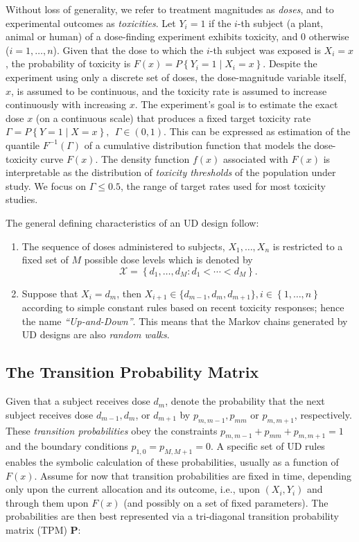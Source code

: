 Without loss of generality, we refer to treatment magnitudes as \emph{doses}, and to experimental outcomes as \emph{toxicities}. Let $Y_i = 1$ if the $i$-th subject (a plant, animal or human) of a dose-finding experiment exhibits toxicity, and $0$ otherwise ($i=1,\ldots ,n$). Given that the dose to which the $i$-th subject was exposed is $X_i=x$, the probability of toxicity is $F(x) = P\left\{Y_i=1\mid X_i =x\right\}$. Despite the experiment using only a discrete set of doses, the dose-magnitude variable itself, $x$, is assumed to be continuous, and the toxicity rate is assumed to increase continuously with increasing $x$.  The experiment's goal is to estimate the exact dose $x$ (on a continuous scale) that produces a fixed target toxicity rate $\Gamma=P\left\{Y=1\mid X=x\right\}, \ \ \Gamma\in(0,1)$. This can be expressed as estimation of the quantile  $F^{-1}(\Gamma)$ of a cumulative distribution function that models the dose-toxicity curve $F(x)$.  The density function $f(x)$ associated with $F(x)$ is interpretable as the distribution of \emph{toxicity thresholds} of the population under study. We focus on $\Gamma\leq 0.5$, the range of target rates used for most toxicity studies.

The general defining characteristics of an UD design follow:
\begin{enumerate}
\item The sequence of doses administered to subjects, $X_1,\ldots,X_n$ is restricted to a fixed set of $M$ possible dose levels which is denoted by $$\mathcal{X} =\left\{d_1,\ldots ,d_M : d_1 <\cdots <d_M\right\}.$$
\item Suppose that $X_i=d_m$, then $X_{i+1}\in\{d_{m-1},d_m,d_{m+1}\},i\in\left\{1,\ldots ,n\right\}$ according to simple constant rules based on recent toxicity responses; hence the name \emph{``Up-and-Down''}. This means that the Markov chains generated by UD designs are also \emph{random walks}.
\end{enumerate}

\subsection{The Transition Probability Matrix}\label{sec:tpm}

 Given that a subject receives dose $d_m$, denote the probability that the next subject receives dose $d_{m-1},d_m$, or $d_{m+1}$ by $p_{m,m-1},p_{mm}$ or $p_{m,m+1}$, respectively. These  \emph{transition probabilities} obey the constraints $p_{m,m-1}+p_{mm}+p_{m,m+1}=1$ and the boundary conditions $p_{1,0}=p_{M,M+1}=0$. A specific set of UD rules enables the symbolic calculation of these probabilities, usually as a function of $F(x)$. Assume for now that transition probabilities are fixed in time, depending only upon the current allocation and its outcome, i.e., upon $\left(X_i,Y_i\right)$ and through them upon $F(x)$ (and possibly on a set of fixed parameters). The probabilities are then best represented via a tri-diagonal transition probability matrix (TPM) $\mathbf{P}$:

